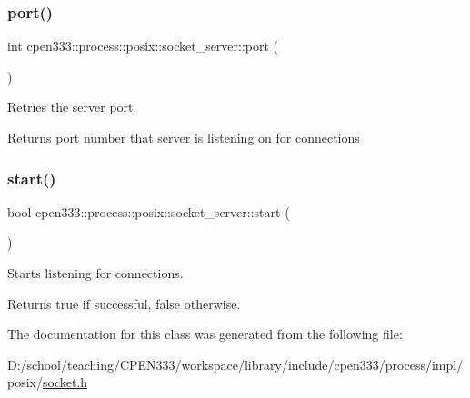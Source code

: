 \subsubsection{\texorpdfstring{port()}{port()}}
{\footnotesize\ttfamily int cpen333\+::process\+::posix\+::socket\+\_\+server\+::port (\begin{DoxyParamCaption}{ }\end{DoxyParamCaption})\hspace{0.3cm}{\ttfamily [inline]}}



Retries the server port. 

\begin{DoxyReturn}{Returns}
port number that server is listening on for connections 
\end{DoxyReturn}
\mbox{\label{classcpen333_1_1process_1_1posix_1_1socket__server_a0d02be64318ad8d7686633f1bdddc677}} 
\subsubsection{\texorpdfstring{start()}{start()}}
{\footnotesize\ttfamily bool cpen333\+::process\+::posix\+::socket\+\_\+server\+::start (\begin{DoxyParamCaption}{ }\end{DoxyParamCaption})\hspace{0.3cm}{\ttfamily [inline]}}



Starts listening for connections. 

\begin{DoxyReturn}{Returns}
true if successful, false otherwise. 
\end{DoxyReturn}


The documentation for this class was generated from the following file\+:\begin{DoxyCompactItemize}
\item 
D\+:/school/teaching/\+C\+P\+E\+N333/workspace/library/include/cpen333/process/impl/posix/\hyperlink{impl_2posix_2socket_8h}{socket.\+h}\end{DoxyCompactItemize}
